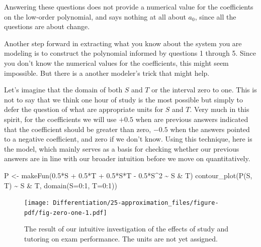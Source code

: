 \documentclass[
  letterpaper,
  DIV=11,
  numbers=noendperiod,
  oneside]{scrreprt}
\newenvironment{Shaded}{\begin{snugshade}}{\end{snugshade}}
\newcommand{\AttributeTok}[1]{\textcolor[rgb]{0.40,0.46,0.14}{#1}}
\newcommand{\DecValTok}[1]{\textcolor[rgb]{0.68,0.00,0.00}{#1}}
\newcommand{\FloatTok}[1]{\textcolor[rgb]{0.68,0.00,0.00}{#1}}
\newcommand{\FunctionTok}[1]{\textcolor[rgb]{0.28,0.35,0.67}{#1}}
\newcommand{\NormalTok}[1]{\textcolor[rgb]{0.00,0.46,0.62}{#1}}
\newcommand{\OtherTok}[1]{\textcolor[rgb]{0.00,0.46,0.62}{#1}}
\newcommand{\SpecialCharTok}[1]{\textcolor[rgb]{0.37,0.37,0.37}{#1}}
\begin{document}
Answering these questions does not provide a numerical value for the
coefficients on the low-order polynomial, and says nothing at all about
\(a_0\), since all the questions are about change.

Another step forward in extracting what you know about the system you
are modeling is to construct the polynomial informed by questions 1
through 5. Since you don't know the numerical values for the
coefficients, this might seem impossible. But there is a another
modeler's trick that might help.

Let's imagine that the domain of both \(S\) and \(T\) or the interval
zero to one. This is not to say that we think one hour of study is the
most possible but simply to defer the question of what are appropriate
units for \(S\) and \(T\). Very much in this spirit, for the
coefficients we will use \(+0.5\) when are previous answers indicated
that the coefficient should be greater than zero, \(-0.5\) when the
answers pointed to a negative coefficient, and zero if we don't know.
Using this technique, here is the model, which mainly serves as a basis
for checking whether our previous answers are in line with our broader
intuition before we move on quantitatively.

\begin{Shaded}
\begin{Highlighting}[]
\NormalTok{P }\OtherTok{\textless{}{-}} \FunctionTok{makeFun}\NormalTok{(}\FloatTok{0.5}\SpecialCharTok{*}\NormalTok{S }\SpecialCharTok{+} \FloatTok{0.5}\SpecialCharTok{*}\NormalTok{T }\SpecialCharTok{+} \FloatTok{0.5}\SpecialCharTok{*}\NormalTok{S}\SpecialCharTok{*}\NormalTok{T }\SpecialCharTok{{-}} \FloatTok{0.5}\SpecialCharTok{*}\NormalTok{S}\SpecialCharTok{\^{}}\DecValTok{2} \SpecialCharTok{\textasciitilde{}}\NormalTok{ S }\SpecialCharTok{\&}\NormalTok{ T)}
\FunctionTok{contour\_plot}\NormalTok{(}\FunctionTok{P}\NormalTok{(S, T) }\SpecialCharTok{\textasciitilde{}}\NormalTok{ S }\SpecialCharTok{\&}\NormalTok{ T, }\FunctionTok{domain}\NormalTok{(}\AttributeTok{S=}\DecValTok{0}\SpecialCharTok{:}\DecValTok{1}\NormalTok{, }\AttributeTok{T=}\DecValTok{0}\SpecialCharTok{:}\DecValTok{1}\NormalTok{))}
\end{Highlighting}
\end{Shaded}

\begin{figure}[H]

{\centering \texttt{[image: Differentiation/25-approximation\_files/figure-pdf/fig-zero-one-1.pdf]}

}

\caption{\label{fig-zero-one}The result of our intuitive investigation
of the effects of study and tutoring on exam performance. The units are
not yet assigned.}

\end{figure}
\end{document}
